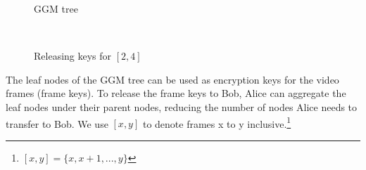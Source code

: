 \documentclass[hyp,a4paper,12pt,openbib]{socreport}
\begin{document}
\begin{figure}[ht]
\begin{minipage}[b]{0.5\textwidth}
\centering
{}
\caption{GGM tree}
\label{fig:hash-tree}
\end{minipage}~
\begin{minipage}[b]{0.5\textwidth}
\centering
{}
\caption{Releasing keys for $[2, 4]$}
\label{fig:cover-ggm}
\end{minipage}
\end{figure}


The leaf nodes of the GGM tree can be used as encryption keys for the video frames (frame keys). To release the frame keys to Bob, Alice can aggregate the leaf nodes under their parent nodes, reducing the number of nodes Alice needs to transfer to Bob. We use $[x,y]$ to denote frames x to y inclusive.\footnote{$[x,y] = \{x,x + 1,...,y\}$}




\end{document}
